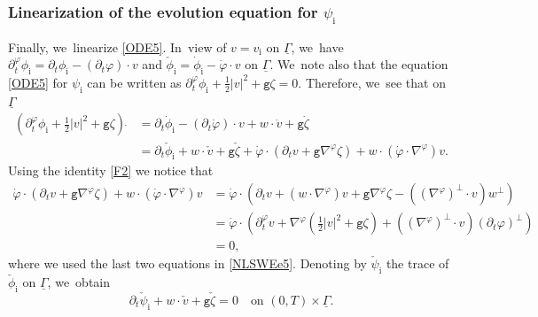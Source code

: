 \documentclass[JEP,XML,SOM,Unicode,NoFloatCountersInSection,published]{cedram}
\newcommand{\gr}{{\mathtt g}}
\newcommand{\dt}{\partial_t}
\newcommand{\ul}[1]{\underline{#1}}
\newcommand{\itGamma}{\mathit{\Gamma}}
\theoremstyle{definition}
\begin{document}
\subsubsection{Linearization of the evolution equation for $\psi_\mathrm{i}$}
Finally, we~linearize \eqref{ODE5}. In~view of $v=v_\mathrm{i}$ on $\ul{\itGamma}$, we~have $\dt^\varphi\phi_\mathrm{i}=\dt\phi_\mathrm{i}-(\dt\varphi)\cdot v$ and
$\check{\phi}_\mathrm{i}=\dot{\phi}_\mathrm{i}-\dot{\varphi}\cdot v$ on $\ul{\itGamma}$. We~note also that the equation \eqref{ODE5} for $\psi_\mathrm{i}$ can be written as $\dt^\varphi\phi_\mathrm{i}+\tfrac12|v|^2+\gr\zeta=0$.
Therefore, we~see that on $\ul{\itGamma}$
\begin{align*}
(\dt^\varphi\phi_\mathrm{i}+\tfrac12|v|^2+\gr\zeta)\,\dot{}
&= \dt\dot{\phi}_\mathrm{i}-(\dt\dot{\varphi})\cdot v + w\cdot\dot{v}+\gr\dot{\zeta} \\
&= \dt\check{\phi}_\mathrm{i}+w\cdot\check{v}+\gr\check{\zeta} + \dot{\varphi}\cdot(\dt v+\gr\nabla^\varphi\zeta) + w\cdot(\dot{\varphi}\cdot\nabla^\varphi)v.
\end{align*}
Using the identity \eqref{F2} we notice that
\begin{align*}
\dot{\varphi}\cdot(\dt v+\gr\nabla^\varphi\zeta) + w\cdot(\dot{\varphi}\cdot\nabla^\varphi)v
&= \dot{\varphi}\cdot(\dt v+(w\cdot\nabla^\varphi)v+\gr\nabla^\varphi\zeta - ((\nabla^\varphi)^\perp\cdot v)w^\perp) \\
&= \dot{\varphi}\cdot(\dt^\varphi v+\nabla^\varphi(\tfrac12|v|^2+\gr\zeta) + ((\nabla^\varphi)^\perp\cdot v)(\dt\varphi)^\perp) \\
&= 0,
\end{align*}
where we used the last two equations in \eqref{NLSWEe5}.
Denoting by $\check{\psi}_\mathrm{i}$ the trace of $\check{\phi}_\mathrm{i}$ on $\ul{\itGamma}$, we~obtain
\begin{equation}\label{LODE1}
\dt\check{\psi}_\mathrm{i}+w\cdot\check{v}+\gr\check{\zeta}=0 \quad\text{on } (0,T)\times\ul{\itGamma}.
\end{equation}
\end{document}
